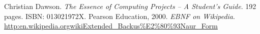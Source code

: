 \cleardoublepage  					%


\begin{thebibliography}{99}
 Christian Dawson. \emph{The Essence of Computing Projects -- A Student's Guide}. 192 pages. ISBN: 013021972X. Pearson Education, 2000.
\emph{EBNF on Wikipedia}. \href{http:\/\/en.wikipedia.org\/wiki\/Extended\_Backus\%E2\%80\%93Naur\_Form}{http:\/\/en.wikipedia.org\/wiki\/Extended\_Backus\%E2\%80\%93Naur\_Form}
\end{thebibliography}
